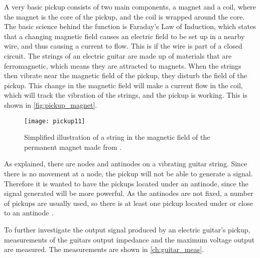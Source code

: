 A very basic pickup consists of two main components, a magnet and a coil, where the magnet is the core of the pickup, and the coil is wrapped around the core. The basic science behind the function is Faraday's Law of Induction, which states that a changing magnetic field causes an electric field to be set up in a nearby wire, and thus causing a current to flow. This is if the wire is part of a closed circuit. The strings of an electric guitar are made up of materials that are ferromagnetic, which means they are attracted to magnets. When the strings then vibrate near the magnetic field of the pickup, they disturb the field of the pickup. This change in the magnetic field will make a current flow in the coil, which will track the vibration of the strings, and the pickup is working. This is shown in \autoref{fig:pickup_magnet}.

\begin{figure}[htbp]
	\centering
	\texttt{[image: pickup11]}
	\caption{Simplified illustration of a string in the magnetic field of the permanent magnet made from \citep{pickup}.}
	\label{fig:pickup_magnet}
\end{figure}

As explained, there are nodes and antinodes on a vibrating guitar string. Since there is no movement at a node, the pickup will not be able to generate a signal. Therefore it is wanted to have the pickups located under an antinode, since the signal generated will be more powerful. As the antinodes are not fixed, a number of pickups are usually used, so there is  at least one pickup located under or close to an antinode \citep{pickup}.

To further investigate the output signal produced by an electric guitar's pickup, measurements of the guitars output impedance and the maximum voltage output are measured. The measurements are shown in \autoref{ch:guitar_meas}. 
